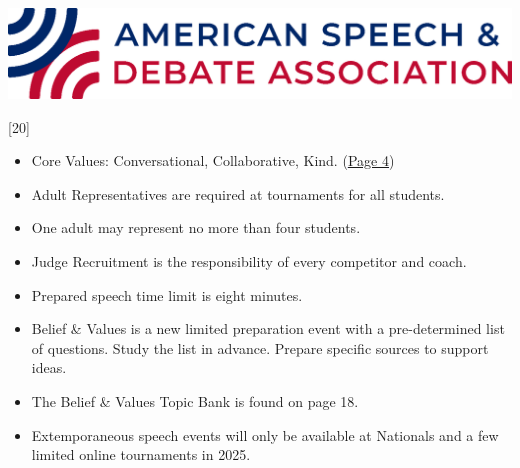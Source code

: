 \documentclass[11pt]{memoir}    %
\def\lowspacing{9pt}
\def\regspacing{19pt}
\def\hispacing{20pt}
\begin{document}
\thispagestyle{CoverStyle}
\addtocounter{page}{-1}

\begin{center}
    \begin{vplace}[0.4]
        \includegraphics[width=0.9815\linewidth,keepaspectratio]{Images/TitlePageLogo.png}\vspace{\hispacing}
        \vspace{\lowspacing}\\
    \end{vplace}
\end{center}

\newpage


[20]



\begin{itemize}
    \item Core Values: Conversational, Collaborative, Kind. (\textcolor{blue}{\uline{\hyperref[subsec:CoreValues]{Page 4}}})
    \item Adult Representatives are required at tournaments for all students.
    \item One adult may represent no more than four students.
    \item Judge Recruitment is the responsibility of every competitor and coach.
\end{itemize}\vspace{\regspacing}

\label{subsec:SpeechEventChanges}
\noindent{}

\begin{itemize}
    \item Prepared speech time limit is eight minutes.
    \item Belief \& Values is a new limited preparation event with a pre-determined list of questions. Study the list in advance. Prepare specific sources to support ideas.
    \item The Belief \& Values Topic Bank is found on page 18.
    \item Extemporaneous speech events will only be available at Nationals and a few limited online tournaments in 2025.
\end{itemize}\vspace{\regspacing}
\end{document}
